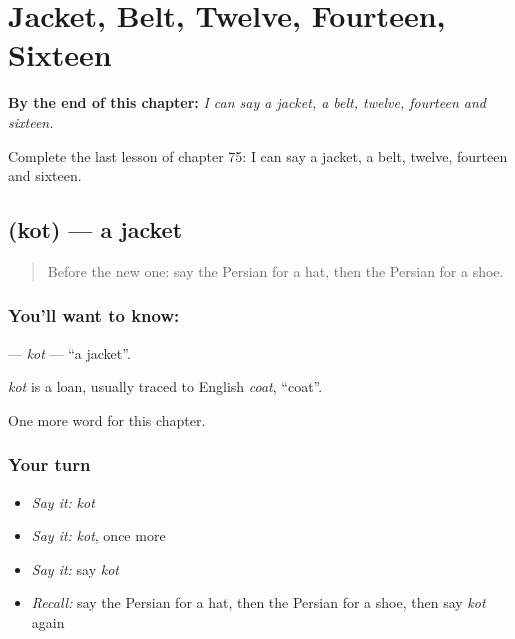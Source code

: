 
\chapter{Jacket, Belt, Twelve, Fourteen, Sixteen}
\label{ch:fa-jacket-belt-twelve-fourteen-sixteen}

\begin{chapteropening}
\textbf{By the end of this chapter:} \emph{I can say a jacket, a belt, twelve, fourteen and sixteen.}

Complete the last lesson of chapter 75: I can say a jacket, a belt, twelve, fourteen and sixteen.
\end{chapteropening}

\section[\texorpdfstring{\fa{کت} (kot)}{کت (kot)}]{ (kot) — a jacket}

\label{lesson:FA-C75-kot}



\begin{quote}
Before the new one: say the Persian for a hat, then the Persian for a shoe.
\end{quote}

\subsection*{You'll want to know: }
\textbf{} — \emph{kot} — \textquotedblleft{}a jacket\textquotedblright{}.

\begin{cousinweb}
\emph{kot} is a loan, usually traced to English \emph{coat}, \textquotedblleft{}coat\textquotedblright{}.
\end{cousinweb}

\begin{grammarlens}[title={What you've built}]
One more word for this chapter.
\end{grammarlens}

\subsection*{Your turn}
\begin{itemize}
\raggedright
  \item \emph{Say it:} \emph{kot}
  \item \emph{Say it:} \emph{kot}, once more
  \item \emph{Say it:} say \emph{kot}
  \item \emph{Recall:} say the Persian for a hat, then the Persian for a shoe, then say \emph{kot} again
\end{itemize}

